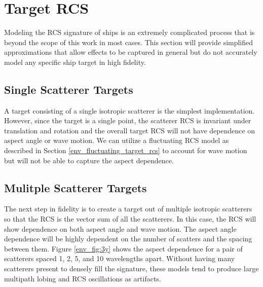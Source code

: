 \section{Target RCS}
Modeling the RCS signature of ships is an extremely complicated process that is beyond the scope of this work in most cases. This section will provide simplified approximations that allow effects to be captured in general but do not accurately model any specific ship target in high fidelity.

\subsection{Single Scatterer Targets}
A target consisting of a single isotropic scatterer is the simplest implementation. However, since the target is a single point, the scatterer RCS is invariant under translation and rotation and the overall target RCS will not have dependence on aspect angle or wave motion. We can utilize a fluctuating RCS model as described in Section \ref{env_fluctuating_target_rcs} to account for wave motion but will not be able to capture the aspect dependence.

\subsection{Mulitple Scatterer Targets}
The next step in fidelity is to create a target out of multiple isotropic scatterers so that the RCS is the vector sum of all the scatterers. In this case, the RCS will show dependence on both aspect angle and wave motion. The aspect angle dependence will be highly dependent on the number of scatters and the spacing between them. Figure \ref{env_fig:3y} shows the aspect dependence for a pair of scatterers spaced 1, 2, 5, and 10 wavelengths apart. Without having many scatterers present to densely fill the signature, these models tend to produce large multipath lobing and RCS oscillations as artifacts.


